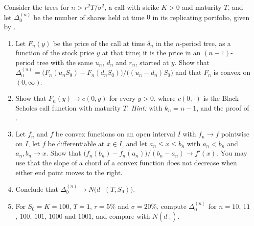 \begin{exercise}\label{ex:bs-delta-limit}
\hard Consider the trees  for $n>r^2T/\sigma^2$, a call with strike $K>0$ and
maturity $T$, and let $\Delta^{(n)}_0$ be the number of shares held at time $0$ in its
replicating portfolio, given by .
\begin{enumerate}[label=(\alph*)]
  \item Let $F_n(y)$ be the price of the call at time $\delta_n$ in the $n$-period tree, as a
    function of the stock price $y$ at that time; it is the price in an $(n-1)$-period tree
    with the same $u_n$, $d_n$ and $r_n$, started at $y$. Show that
    $\Delta^{(n)}_0=\big(F_n(u_nS_0)-F_n(d_nS_0)\big)/\big((u_n-d_n)S_0\big)$ and that $F_n$ is
    convex on $(0,\infty)$.
  \item Show that $F_n(y)\to c(0,y)$ for every $y>0$, where $c(0,\cdot)$ is the
    Black--Scholes call function with maturity $T$. \emph{Hint:}  with
    $k_n=n-1$, and the proof of .
  \item Let $f_n$ and $f$ be convex functions on an open interval $I$ with $f_n\to f$
    pointwise on $I$, let $f$ be differentiable at $x\in I$, and let $a_n\le x\le b_n$ with
    $a_n<b_n$ and $a_n,b_n\to x$. Show that
    $\big(f_n(b_n)-f_n(a_n)\big)/(b_n-a_n)\to f'(x)$. You may use that the slope of a chord
    of a convex function does not decrease when either end point moves to the right.
  \item Conclude that $\Delta^{(n)}_0\to N\big(d_+(T,S_0)\big)$.
  \item For $S_0=K=100$, $T=1$, $r=5\%$ and $\sigma=20\%$, compute $\Delta^{(n)}_0$ for
    $n=10$, $11$, $100$, $101$, $1000$ and $1001$, and compare with $N(d_+)$.
\end{enumerate}
\end{exercise}


